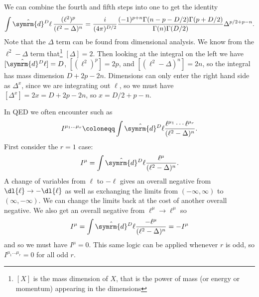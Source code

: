 \documentclass[fleqn]{NotesClass}
\newcommand{\dhat}[1]{\hat{\symrm{d}}{#1}}
\begin{document}
    We can combine the fourth and fifth steps into one to get the identity
    \begin{equation*}
        \int \dhat{^D\ell} \, \frac{(\ell^2)^p}{(\ell^2 - \Delta)^n} = \frac{i}{(4\pi)^{D/2}} \frac{(-1)^{p + n} \Gamma(n - p - D/2)\Gamma(p + D/2)}{\Gamma(n)\Gamma(D/2)} \Delta^{p/2 + p - n}.
    \end{equation*}
    Note that the \(\Delta\) term can be found from dimensional analysis.
    We know from the \(\ell^2 - \Delta\) term that\footnote{\([X]\) is the mass dimension of \(X\), that is the power of mass (or energy or momentum) appearing in the dimensions} \([\Delta] = 2\).
    Then looking at the integral on the left we have \([\dhat{^D\ell}] = D\), \([(\ell^2)^p] = 2p\), and \([(\ell^2 - \Delta)^n] = 2n\), so the integral has mass dimension \(D + 2p - 2n\).
    Dimensions can only enter the right hand side as \(\Delta^x\), since we are integrating out \(\ell\), so we must have \([\Delta^x] = 2x = D + 2p - 2n\), so \(x = D/2 + p - n\).
    
    In QED we often encounter  such as
    \begin{equation}
        I^{\mu_1 \dotso \mu_r} \coloneqq \int \dhat{^D\ell} \frac{\ell^{\mu_1} \dotsm \ell^{\mu_r}}{(\ell^2 - \Delta)^n}.
    \end{equation}
    First consider the \(r = 1\) case:
    \begin{equation}
        I^\mu = \int \dhat{^D\ell} \frac{\ell^\mu}{(\ell^2 - \Delta)^n}.
    \end{equation}
    A change of variables from \(\ell\) to \(-\ell\) gives an overall negative from \(\dl{\ell} \to -\dl{\ell}\) as well as exchanging the limits from \((-\infty, \infty)\) to \((\infty, -\infty)\).
    We can change the limits back at the cost of another overall negative.
    We also get an overall negative from \(\ell^\mu \to \ell^\mu\) so
    \begin{equation}
        I^\mu = \int \dhat{^D\ell} \frac{-\ell^\mu}{(\ell^2 - \Delta)^n} = -I^\mu
    \end{equation}
    and so we must have \(I^\mu = 0\).
    This same logic can be applied whenever \(r\) is odd, so \(I^{\mu_1 \dotso \mu_r} = 0\) for all odd \(r\).
    
\end{document}
